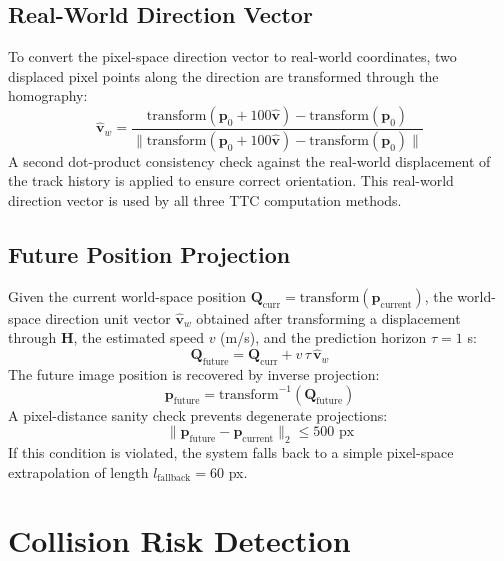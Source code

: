 \documentclass[12pt]{report}
\begin{document}
\subsection{Real-World Direction Vector}

To convert the pixel-space direction vector to real-world coordinates, two displaced pixel points along the direction are transformed through the homography:
\begin{equation}
    \hat{\mathbf{v}}_w = \frac{\text{transform}(\mathbf{p}_0 + 100\hat{\mathbf{v}}) - \text{transform}(\mathbf{p}_0)}{\|\text{transform}(\mathbf{p}_0 + 100\hat{\mathbf{v}}) - \text{transform}(\mathbf{p}_0)\|}
    \label{eq:real_direction}
\end{equation}
A second dot-product consistency check against the real-world displacement of the track history is applied to ensure correct orientation.
This real-world direction vector is used by all three TTC computation methods.

\subsection{Future Position Projection}

Given the current world-space position $\mathbf{Q}_\text{curr} = \text{transform}(\mathbf{p}_\text{current})$, the world-space direction unit vector $\hat{\mathbf{v}}_w$ obtained after transforming a displacement through $\mathbf{H}$, the estimated speed $v$ (m/s), and the prediction horizon $\tau = 1$ s:
\begin{equation}
    \mathbf{Q}_\text{future} = \mathbf{Q}_\text{curr} + v\,\tau\,\hat{\mathbf{v}}_w
    \label{eq:future_world}
\end{equation}
The future image position is recovered by inverse projection:
\begin{equation}
    \mathbf{p}_\text{future} = \text{transform}^{-1}(\mathbf{Q}_\text{future})
    \label{eq:future_pixel}
\end{equation}
A pixel-distance sanity check prevents degenerate projections:
\begin{equation}
    \|\mathbf{p}_\text{future} - \mathbf{p}_\text{current}\|_2 \leq 500 \text{ px}
    \label{eq:sanity_check}
\end{equation}
If this condition is violated, the system falls back to a simple pixel-space extrapolation of length $l_\text{fallback} = 60$ px.

\section{Collision Risk Detection}
\end{document}

